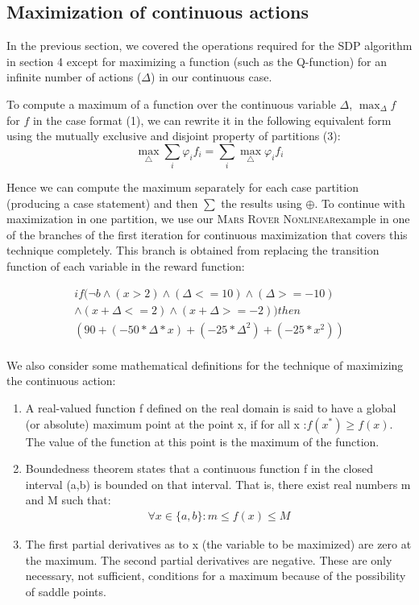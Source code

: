 \documentclass[letterpaper]{article}
\newcommand{\MarsRoverNL}{\textsc{Mars Rover Nonlinear}}
\begin{document}
\subsection{Maximization of continuous actions}


In the previous section, we covered the operations required for the SDP algorithm in section 4 except for maximizing a function (such as the Q-function) for an infinite number of actions ($\Delta$) in our continuous case. 

To compute a maximum of a function over the continuous variable $\Delta$, $\max_{\Delta} f $ for $f$
in the case format (1), we can rewrite it in the following equivalent form using the mutually exclusive and disjoint property of partitions (3):
\begin{equation}
\max_{\bigtriangleup}\sum_{i}\varphi_{i}f_{i}=\sum_{i}\max_{\bigtriangleup}\varphi_{i}f_{i}
\end{equation}

Hence we can compute the maximum separately for each case partition (producing a case statement) and then $\sum$ the results using $\oplus$.
To continue with maximization in one partition, we use our \MarsRoverNL example in one of the branches of the first iteration for continuous maximization that covers this technique completely. This branch is obtained from replacing the transition function of each variable in the reward function:

{\footnotesize
\begin{align*}
if (\neg b \wedge (x > 2) \wedge (\Delta <=10) \wedge (\Delta >=-10) \\
\wedge (x+\Delta <=2) \wedge (x+\Delta >=-2)) then \\ 
(90 + (-50 * \Delta * x) + (-25 * \Delta ^2) + (-25 * x^2)) \\ 
\end{align*}
}

We also consider some mathematical definitions for the technique of maximizing the continuous action: 
\begin{enumerate}
\item A real-valued function f defined on the real domain is said to have a global (or absolute) maximum point at the point x, if for all x :$ f(x^{*}) \geq f(x) $. The value of the function at this point is the maximum of the function.
\item Boundedness theorem states that a continuous function f in the closed interval (a,b) is bounded on that interval. That is, there exist real numbers m and M such that:
\begin{align*}
\forall x \in \{a,b\} : m \leq f(x) \leq M 
\end{align*}
\item The first partial derivatives as to x (the variable to be maximized) are zero at the maximum. The second partial derivatives are negative. These are only necessary, not sufficient, conditions for a maximum because of the possibility of saddle points.
\end{enumerate}
\end{document}
